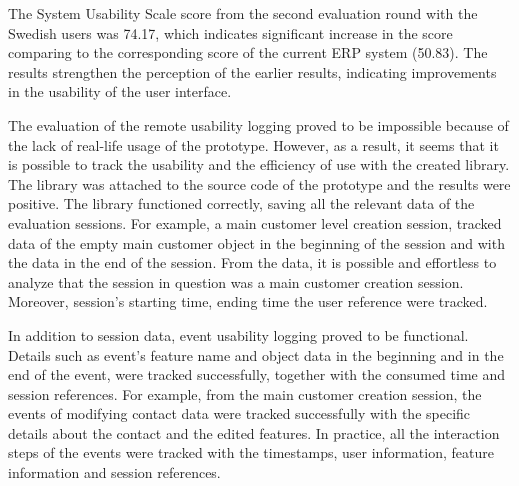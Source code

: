 \documentclass[12pt,a4paper,oneside,pdftex]{report}
\begin{document}
The System Usability Scale score from the second evaluation round with the Swedish users was 74.17, which indicates significant increase in the score comparing to the corresponding score of the current ERP system (50.83). The results strengthen the perception of the earlier results, indicating improvements in the usability of the user interface. 
 
The evaluation of the remote usability logging proved to be impossible because of the lack of real-life usage of the prototype. However, as a result, it seems that it is possible to track the usability and the efficiency of use with the created library. The library was attached to the source code of the prototype and the results were positive. The library functioned correctly, saving all the relevant data of the evaluation sessions. For example, a main customer level creation session, tracked data of the empty main customer object in the beginning of the session and with the data in the end of the session. From the data, it is possible and effortless to analyze that the session in question was a main customer creation session. Moreover, session's starting time, ending time the user reference were tracked. 

In addition to session data, event usability logging proved to be functional. Details such as event's feature name and object data in the beginning and in the end of the event, were tracked successfully, together with the consumed time and session references. For example, from the main customer creation session, the events of modifying contact data were tracked successfully with the specific details about the contact and the edited features. In practice, all the interaction steps of the events were tracked with the timestamps, user information, feature information and session references.






\end{document}
